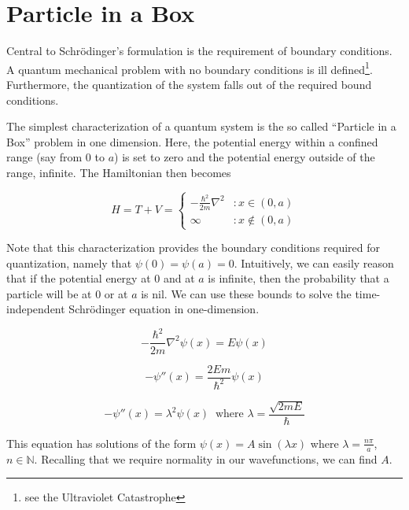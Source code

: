 \documentclass[12pt,]{book}
\begin{document}
\section{Particle in a Box}\label{particle-in-a-box}

Central to Schrödinger's formulation is the requirement of boundary
conditions. A quantum mechanical problem with no boundary conditions is
ill defined\footnote{see the Ultraviolet Catastrophe}. Furthermore, the
quantization of the system falls out of the required bound conditions.

The simplest characterization of a quantum system is the so called
``Particle in a Box'' problem in one dimension. Here, the potential
energy within a confined range (say from 0 to \(a\)) is set to zero and
the potential energy outside of the range, infinite. The Hamiltonian
then becomes

\begin{equation}
   H = T + V =  \left\{
     \begin{array}{lr}
       -\frac{\hbar^2}{2m}\nabla^2 & : x \in (0,a)\\
       \infty & : x \notin (0,a)
     \end{array}
   \right.
\label{eq:hamiltonian_particle_in_a_box}\end{equation}

Note that this characterization provides the boundary conditions
required for quantization, namely that \(\psi(0)=\psi(a)=0\).
Intuitively, we can easily reason that if the potential energy at 0 and
at \(a\) is infinite, then the probability that a particle will be at 0
or at \(a\) is nil. We can use these bounds to solve the
time-independent Schrödinger equation in one-dimension.

\begin{equation}-\frac{\hbar^2}{2m}\nabla^2 \psi(x) = E\psi(x)\label{eq:particle_in_a_box_eigenequation}\end{equation}

\begin{equation}- \psi''(x) = \frac{2Em}{\hbar^2}\psi(x)\label{eq:particle_in_a_box_intermediate}\end{equation}

\begin{equation}-\psi''(x)= \lambda^2\psi(x)\ \text{ where } 
\lambda=\frac{\sqrt{2mE}}{\hbar}\label{eq:solution_particle_in_a_box}\end{equation}

This equation has solutions of the form \(\psi(x)=A\sin(\lambda x)\)
where \(\lambda =\frac{n\pi}{a}\), \(n\in\mathbb{N}\). Recalling that we
require normality in our wavefunctions, we can find \(A\).
\end{document}
